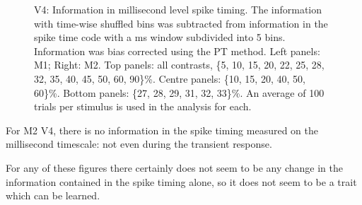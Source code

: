 \begin{figure}[htbp]
\begin{subfigure}[b]{0.5\linewidth}
    \end{subfigure}
    \caption{V4: Information in millisecond level spike timing.
The information with time-wise shuffled bins was subtracted from information in the spike time code with a \unit[20]{ms} window subdivided into 5 bins.
Information was bias corrected using the PT method.
Left panels: M1; Right: M2.
Top panels: all contrasts, \{5, 10, 15, 20, 22, 25, 28, 32, 35, 40, 45, 50, 60, 90\}\%.
Centre panels: \{10, 15, 20, 40, 50, 60\}\%.
Bottom panels: \{27, 28, 29, 31, 32, 33\}\%.
An average of 100 trials per stimulus is used in the analysis for each.
}
    \label{fig:v4-dif}
\end{figure}


For M2 V4, there is no information in the spike timing measured on the millisecond timescale: not even during the transient response.

For any of these figures there certainly does not seem to be any change in the information contained in the spike timing alone, so it does not seem to be a trait which can be learned.

